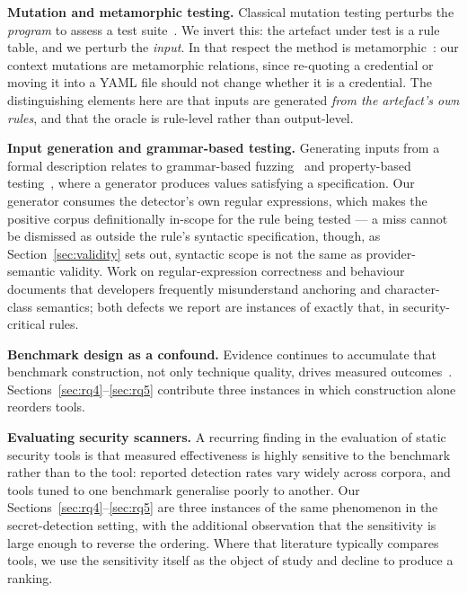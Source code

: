 \documentclass[pdflatex,sn-basic]{sn-jnl}
\begin{document}
\textbf{Mutation and metamorphic testing.} Classical mutation testing perturbs the \emph{program} to assess a test suite~\citep{jia2011,demillo1978}. We invert this: the artefact under test is a rule table, and we perturb the \emph{input}. In that respect the method is metamorphic~\citep{chen2018metamorphic,segura2016}: our context mutations are metamorphic relations, since re-quoting a credential or moving it into a YAML file should not change whether it is a credential. The distinguishing elements here are that inputs are generated \emph{from the artefact's own rules}, and that the oracle is rule-level rather than output-level.

\textbf{Input generation and grammar-based testing.} Generating inputs from a formal description relates to grammar-based fuzzing~\citep{godefroid2008} and property-based testing~\citep{claessen2000}, where a generator produces values satisfying a specification. Our generator consumes the detector's own regular expressions, which makes the positive corpus definitionally in-scope for the rule being tested --- a miss cannot be dismissed as outside the rule's syntactic specification, though, as Section~\ref{sec:validity} sets out, syntactic scope is not the same as provider-semantic validity. Work on regular-expression correctness and behaviour~\citep{chapman2016,michael2019} documents that developers frequently misunderstand anchoring and character-class semantics; both defects we report are instances of exactly that, in security-critical rules.

\textbf{Benchmark design as a confound.} Evidence continues to accumulate that benchmark construction, not only technique quality, drives measured outcomes~\citep{liem2020,herbold2020}. Sections~\ref{sec:rq4}--\ref{sec:rq5} contribute three instances in which construction alone reorders tools.

\textbf{Evaluating security scanners.} A recurring finding in the evaluation of static security tools is that measured effectiveness is highly sensitive to the benchmark rather than to the tool: reported detection rates vary widely across corpora, and tools tuned to one benchmark generalise poorly to another. Our Sections~\ref{sec:rq4}--\ref{sec:rq5} are three instances of the same phenomenon in the secret-detection setting, with the additional observation that the sensitivity is large enough to reverse the ordering. Where that literature typically compares tools, we use the sensitivity itself as the object of study and decline to produce a ranking.
\end{document}

